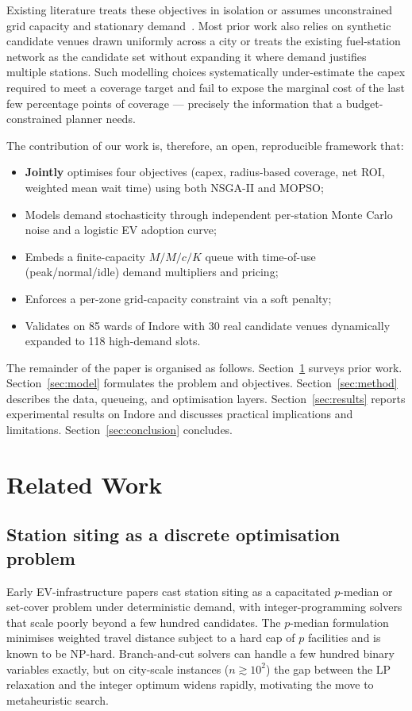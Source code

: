 \documentclass[conference]{IEEEtran}
\begin{document}
Existing literature treats these objectives in isolation or assumes
unconstrained grid capacity and stationary
demand~\cite{ref_ev_planning_review,ref_metaheuristic_ev}.
Most prior work also relies on synthetic candidate venues drawn
uniformly across a city or treats the existing fuel-station network
as the candidate set without expanding it where demand justifies
multiple stations. Such modelling choices systematically
under-estimate the capex required to meet a coverage target and
fail to expose the marginal cost of the last few percentage points
of coverage --- precisely the information that a budget-constrained
planner needs.

The contribution of our work is, therefore, an open, reproducible
framework that:
\begin{itemize}
\item \textbf{Jointly} optimises four objectives (capex, radius-based
      coverage, net ROI, weighted mean wait time) using both NSGA-II and
      MOPSO;
\item Models demand stochasticity through independent per-station
      Monte Carlo noise and a logistic EV adoption curve;
\item Embeds a finite-capacity $M/M/c/K$ queue with time-of-use
      (peak/normal/idle) demand multipliers and pricing;
\item Enforces a per-zone grid-capacity constraint via a soft penalty;
\item Validates on 85 wards of Indore with 30 real candidate
      venues dynamically expanded to 118 high-demand slots.
\end{itemize}

The remainder of the paper is organised as follows.
Section~\ref{sec:related} surveys prior work. Section~\ref{sec:model}
formulates the problem and objectives. Section~\ref{sec:method} describes
the data, queueing, and optimisation layers. Section~\ref{sec:results}
reports experimental results on Indore and discusses practical
implications and limitations.
Section~\ref{sec:conclusion} concludes.

\section{Related Work}
\label{sec:related}

\subsection{Station siting as a discrete optimisation problem}
Early EV-infrastructure papers cast station siting as a capacitated
$p$-median or set-cover problem under deterministic demand, with
integer-programming solvers that scale poorly beyond a few hundred
candidates. The $p$-median formulation
minimises weighted travel distance subject to a hard cap of $p$
facilities and is known to be NP-hard. Branch-and-cut solvers can
handle a few hundred binary variables exactly, but on city-scale
instances ($n\!\gtrsim\!10^{2}$) the gap between the LP relaxation
and the integer optimum widens rapidly, motivating the move to
metaheuristic search.
\end{document}
